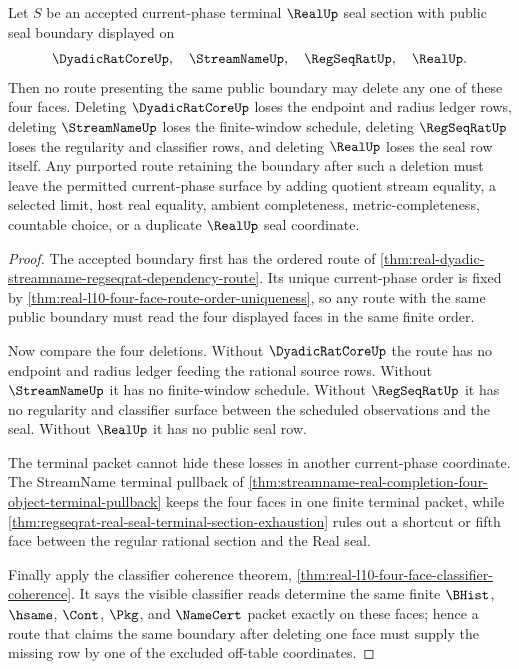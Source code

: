 \begin{theorem}
\label{thm:real-l10-route-face-deletion-obstruction}
Let $S$ be an accepted current-phase terminal $\RealUp$ seal section with public seal boundary displayed on
$$
\DyadicRatCoreUp,\quad \StreamNameUp,\quad \RegSeqRatUp,\quad \RealUp .
$$
Then no route presenting the same public boundary may delete any one of these four faces. Deleting $\DyadicRatCoreUp$ loses the endpoint and radius ledger rows, deleting $\StreamNameUp$ loses the finite-window schedule, deleting $\RegSeqRatUp$ loses the regularity and classifier rows, and deleting $\RealUp$ loses the seal row itself. Any purported route retaining the boundary after such a deletion must leave the permitted current-phase surface by adding quotient stream equality, a selected limit, host real equality, ambient completeness, metric-completeness, countable choice, or a duplicate $\RealUp$ seal coordinate.
\end{theorem}
\begin{proof}
The accepted boundary first has the ordered route of \autoref{thm:real-dyadic-streamname-regseqrat-dependency-route}. Its unique current-phase order is fixed by \autoref{thm:real-l10-four-face-route-order-uniqueness}, so any route with the same public boundary must read the four displayed faces in the same finite order.

Now compare the four deletions. Without $\DyadicRatCoreUp$ the route has no endpoint and radius ledger feeding the rational source rows. Without $\StreamNameUp$ it has no finite-window schedule. Without $\RegSeqRatUp$ it has no regularity and classifier surface between the scheduled observations and the seal. Without $\RealUp$ it has no public seal row.

The terminal packet cannot hide these losses in another current-phase coordinate. The StreamName terminal pullback of \autoref{thm:streamname-real-completion-four-object-terminal-pullback} keeps the four faces in one finite terminal packet, while \autoref{thm:regseqrat-real-seal-terminal-section-exhaustion} rules out a shortcut or fifth face between the regular rational section and the Real seal.

Finally apply the classifier coherence theorem, \autoref{thm:real-l10-four-face-classifier-coherence}. It says the visible classifier reads determine the same finite $\BHist$, $\hsame$, $\Cont$, $\Pkg$, and $\NameCert$ packet exactly on these faces; hence a route that claims the same boundary after deleting one face must supply the missing row by one of the excluded off-table coordinates.
\end{proof}

